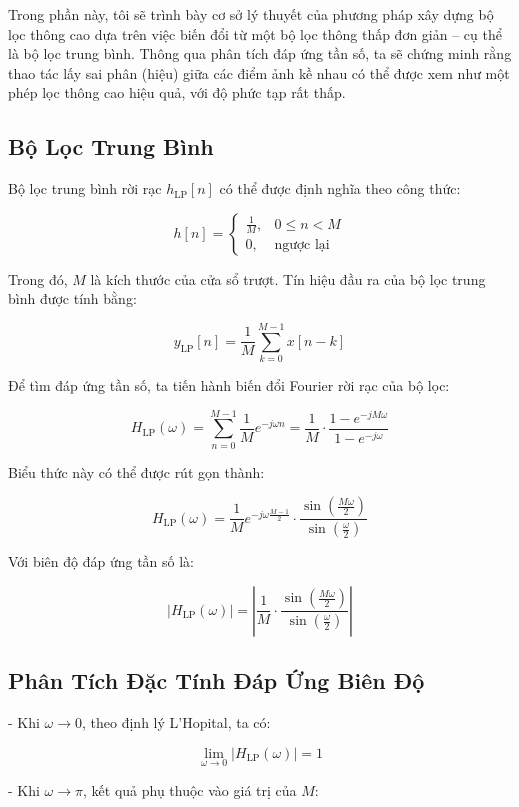 Trong phần này, tôi sẽ trình bày cơ sở lý thuyết của phương pháp xây dựng bộ lọc thông cao dựa trên việc biến đổi từ một bộ lọc thông thấp đơn giản – cụ thể là bộ lọc trung bình. 
%
Thông qua phân tích đáp ứng tần số, ta sẽ chứng minh rằng thao tác lấy sai phân (hiệu) giữa các điểm ảnh kề nhau có thể được xem như một phép lọc thông cao hiệu quả, với độ phức tạp rất thấp.

\subsection{Bộ Lọc Trung Bình}

Bộ lọc trung bình rời rạc \( h_{\mathrm{LP}}[n] \) có thể được định nghĩa theo công thức:

\[
h[n] =
\begin{cases}
	\frac{1}{M}, & 0 \leq n < M \\
	0, & \text{ngược lại}
\end{cases}
\]

Trong đó, \( M \) là kích thước của cửa sổ trượt. Tín hiệu đầu ra của bộ lọc trung bình được tính bằng:

\[
y_{\mathrm{LP}}[n] = \frac{1}{M} \sum_{k=0}^{M-1} x[n-k]
\]

Để tìm đáp ứng tần số, ta tiến hành biến đổi Fourier rời rạc của bộ lọc:

\[
H_{\mathrm{LP}}(\omega) = \sum_{n=0}^{M-1} \frac{1}{M} e^{-j \omega n} = \frac{1}{M} \cdot \frac{1 - e^{-j M \omega}}{1 - e^{-j \omega}}
\]

Biểu thức này có thể được rút gọn thành:

\[
H_{\mathrm{LP}}(\omega) = \frac{1}{M} e^{-j \omega \frac{M-1}{2}} \cdot \frac{\sin\left(\frac{M \omega}{2}\right)}{\sin\left(\frac{\omega}{2}\right)}
\]

Với biên độ đáp ứng tần số là:

\[
|H_{\mathrm{LP}}(\omega)| = \left| \frac{1}{M} \cdot \frac{\sin\left( \frac{M \omega}{2} \right)}{\sin\left( \frac{\omega}{2} \right)} \right|
\]

\subsection*{Phân Tích Đặc Tính Đáp Ứng Biên Độ}

- Khi \( \omega \to 0 \), theo định lý L'Hopital, ta có:

\[
\lim_{\omega \to 0} |H_{\mathrm{LP}}(\omega)| = 1
\]

- Khi \( \omega \to \pi \), kết quả phụ thuộc vào giá trị của \( M \):

